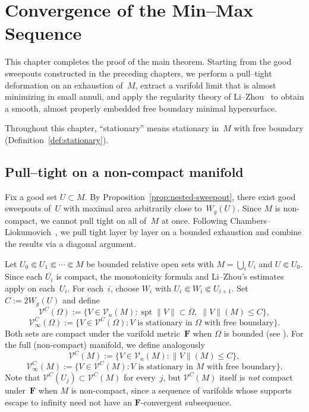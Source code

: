 \chapter{Convergence of the Min--Max Sequence}\label{ch:convergence-of-min-max}

This chapter completes the proof of the main theorem. Starting from the good sweepouts constructed in the preceding chapters, we perform a pull--tight deformation on an exhaustion of~$M$, extract a varifold limit that is almost minimizing in small annuli, and apply the regularity theory of Li--Zhou~\cite{LZ17} to obtain a smooth, almost properly embedded free boundary minimal hypersurface.

Throughout this chapter, ``stationary'' means stationary in~$M$ with free boundary (Definition~\ref{def:stationary}).

\section{Pull--tight on a non-compact manifold}\label{sec:pull-tight}

Fix a good set $U\subset M$. By Proposition~\ref{prop:nested-sweepout}, there exist good sweepouts of~$U$ with maximal area arbitrarily close to~$W_g(U)$. Since $M$ is non-compact, we cannot pull tight on all of~$M$ at once. Following Chambers--Liokumovich~\cite[\S7]{CL20}, we pull tight layer by layer on a bounded exhaustion and combine the results via a diagonal argument.

Let $U_0\Subset U_1\Subset\cdots\Subset M$ be bounded relative open sets with $M=\bigcup_i U_i$ and $U\Subset U_0$. Since each $\overline{U_i}$ is compact, the monotonicity formula \cite[Theorem~2.1]{LZ17} and Li--Zhou's estimates \cite[Section~3]{LZ17} apply on each~$U_i$. For each~$i$, choose $W_i$ with $U_i\Subset W_i\Subset U_{i+1}$. Set $C:=2W_g(U)$ and define
\[
\mathcal{V}^C(\Omega):=\bigl\{V\in\mathcal{V}_n(M):\operatorname{spt}\|V\|\subset\overline\Omega,\;\|V\|(M)\le C\bigr\},
\]
\[
\mathcal{V}^C_\infty(\Omega):=\bigl\{V\in\mathcal{V}^C(\Omega): V\text{ is stationary in }\Omega\text{ with free boundary}\bigr\}.
\]
Both sets are compact under the varifold metric~$\mathbf{F}$ when $\Omega$ is bounded (see \cite[Lemma~3.4]{LZ17}). For the full (non-compact) manifold, we define analogously
\[
\mathcal{V}^C(M):=\bigl\{V\in\mathcal{V}_n(M): \|V\|(M)\le C\bigr\},
\]
\[
\mathcal{V}^C_\infty(M):=\bigl\{V\in\mathcal{V}^C(M): V\text{ is stationary in }M\text{ with free boundary}\bigr\}.
\]
Note that $\mathcal{V}^C(U_j)\subset\mathcal{V}^C(M)$ for every~$j$, but $\mathcal{V}^C(M)$ itself is \emph{not} compact under~$\mathbf{F}$ when $M$ is non-compact, since a sequence of varifolds whose supports escape to infinity need not have an $\mathbf{F}$-convergent subsequence.

